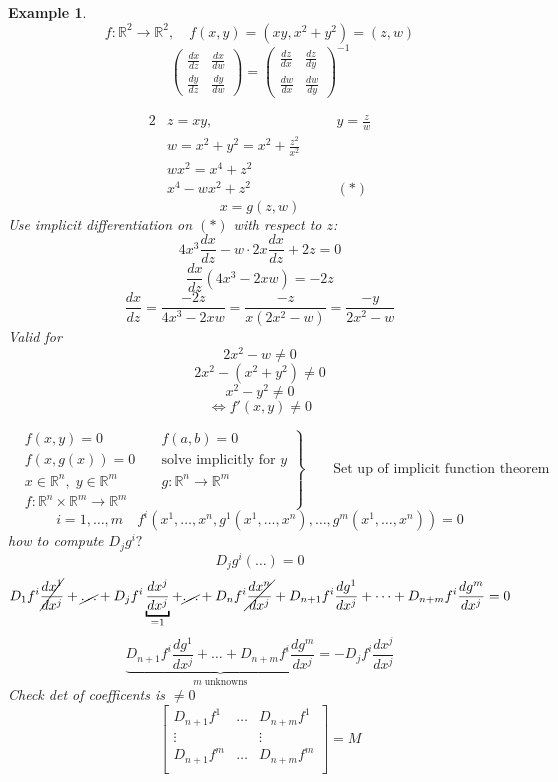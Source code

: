 \documentclass[12pt]{article}
\def\RR{\mathbb{R}}
\newtheorem{example}{Example}[section]
\begin{document}
\begin{example}
\[f: \RR^2 \rightarrow \RR^2, \quad f(x,y) = (xy, x^2 + y^2) = (z,w)\]
\[
\begin{pmatrix}
 \frac{dx}{dz} & \frac{dx}{dw}\\
\frac{dy}{dz} & \frac{dy}{dw}
 \end{pmatrix} =   \begin{pmatrix}
 \frac{dz}{dx} & \frac{dz}{dy}\\
\frac{dw}{dx} & \frac{dw}{dy}
 \end{pmatrix}^{-1} \]

\begin{alignat*}{2}
&z=xy, &\quad &y= \frac{z}{w} \\
&w = x^2 + y^2 = x^2 + \frac{z^2}{x^2} &\quad & \\
&wx^2 = x^4 + z^2 &\quad & \\
& x^4 - wx^2 + z^2 &\quad & (*)
\end{alignat*}
\[x=g(z,w)\]
Use implicit differentiation on $(*)$ with respect to $z$:
\[4x^3\frac{dx}{dz} - w \cdot 2x\frac{dx}{dz} + 2z = 0\]
\[\frac{dx}{dz}(4x^3 - 2xw) = -2z\]
\[\frac{dx}{dz} = \frac{-2z}{4x^3 - 2xw}=  \frac{-z}{x(2x^2 - w)}=  \frac{-y}{2x^2 - w}\]
Valid for
\[2x^2 - w \neq 0 \]
\[2x^2 - (x^2 + y^2) \neq 0 \]
\[x^2 - y^2 \neq 0 \]
\[ \Leftrightarrow f'(x,y) \neq 0\]

\[\left.\begin{aligned}
       & f(x,y) = 0 & \; &f(a,b)= 0 \\
        & f(x,g(x)) = 0 & \; &\text{solve implicitly for $y$} \\
	& x \in \RR^n, \; y \in \RR^m & \; & g:\RR^n \rightarrow \RR^m\\
	&f:\RR^n \times \RR^m \rightarrow \RR^m &\; & 
       \end{aligned}
 \right\}
 \qquad \text{Set up of implicit function theorem }\]
\[i=1,\dots,m \quad f^{i}(x^1 , \dots , x^n , g^1(x^1, \dots, x^n), \dots, g^m(x^1, \dots, x^n)) =0\]
how to compute $D_{j}g^{i}?$
\[D_{j}g^{i}(\dots) = 0\]
\[D_{1}f^i\cancel{\frac{dx^1}{dx^j}} + \cancel{\dots} +  D_{j}f^i\underbracket{\frac{dx^j}{dx^j}}_{= 1} + \cancel{\dots} + D_{n}f^i\cancel{\frac{dx^n}{dx^j}}+D_{n+1}f^i\frac{dg^1}{dx^j} + \dots + D_{n+m}f^i\frac{dg^m}{dx^j}=0\]
\[\underbrace{D_{n+1}f^i\frac{dg^1}{dx^j} + \dots + D_{n+m}f^i\frac{dg^m}{dx^j}}_{m \; \text{unknowns}}= - D_{j}f^i\frac{dx^j}{dx^j} \]
Check det of coefficents is $\neq 0$ 
\[\left[\begin{array}{ccc}
D_{n+1}f^1 & \dots & D_{n+m}f^1\\
\vdots & & \vdots\\
D_{n+1}f^m & \dots & D_{n+m}f^m\\
\end{array} \right] = M\]
\end{example}
\end{document}
